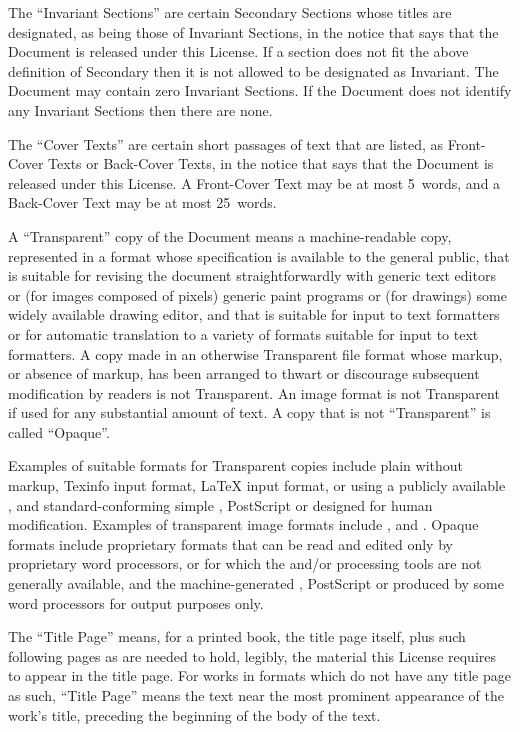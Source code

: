 \begin{enumerate}
  The ``Invariant Sections'' are certain Secondary Sections whose
  titles are designated, as being those of Invariant Sections, in the
  notice that says that the Document is released under this License.
  If a section does not fit the above definition of Secondary then it
  is not allowed to be designated as Invariant.  The Document may
  contain zero Invariant Sections.  If the Document does not identify
  any Invariant Sections then there are none.

  The ``Cover Texts'' are certain short passages of text that are
  listed, as Front-Cover Texts or Back-Cover Texts, in the notice that
  says that the Document is released under this License.  A
  Front-Cover Text may be at most 5~words, and a Back-Cover Text may
  be at most 25~words.

  A ``Transparent'' copy of the Document means a machine-readable
  copy, represented in a format whose specification is available to
  the general public, that is suitable for revising the document
  straightforwardly with generic text editors or (for images composed
  of pixels) generic paint programs or (for drawings) some widely
  available drawing editor, and that is suitable for input to text
  formatters or for automatic translation to a variety of formats
  suitable for input to text formatters.  A copy made in an otherwise
  Transparent file format whose markup, or absence of markup, has been
  arranged to thwart or discourage subsequent modification by readers
  is not Transparent.  An image format is not Transparent if used for
  any substantial amount of text.  A copy that is not ``Transparent''
  is called ``Opaque''.

  Examples of suitable formats for Transparent copies include plain
   without markup, Texinfo input format, \LaTeX{} input
  format,  or  using a publicly available
  , and standard-conforming simple ,
  PostScript or  designed for human modification.
  Examples of transparent image formats include ,
   and .  Opaque formats include proprietary
  formats that can be read and edited only by proprietary word
  processors,  or  for which the
   and/or processing tools are not generally available,
  and the machine-generated , PostScript or
   produced by some word processors for output purposes
  only.

  The ``Title Page'' means, for a printed book, the title page itself,
  plus such following pages as are needed to hold, legibly, the
  material this License requires to appear in the title page.  For
  works in formats which do not have any title page as such, ``Title
  Page'' means the text near the most prominent appearance of the
  work's title, preceding the beginning of the body of the text.


\end{enumerate}

